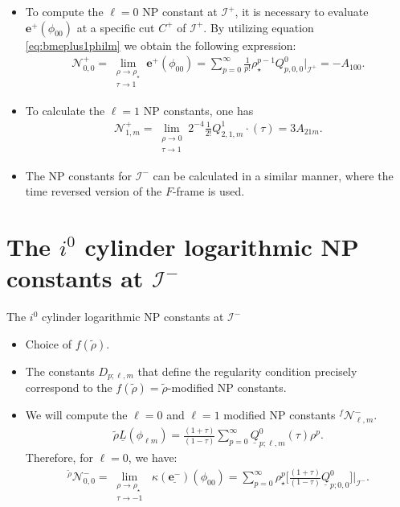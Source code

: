 \documentclass{beamer}
\theoremstyle{remark}
\theoremstyle{plain}
\theoremstyle{plain}
\begin{document}
\begin{frame}
  \begin{itemize}
    \item To compute the $\ell=0$ NP constant at $\mathscr{I}^{+}$, it is necessary to evaluate $\boldsymbol{e}^{+}(\phi_{00})$ at a specific cut ${C}^{+}$ of $\mathscr{I}^{+}$. By utilizing equation \eqref{eq:bmeplus1philm} we obtain the following expression:
    \begin{align}
      \mathcal{N}^{+}_{0,0}= \lim_{\substack{\rho \to \rho_{\star} \\ \tau \to 1}}  \boldsymbol{e}^{+}(\phi_{00}) =\sum_{p=0}^{\infty} \frac{1}{p!}\rho^{p-1}_{\star}Q^{0}_{p,0,0}|_{\mathscr{I}^{+}} = -A_{100}.
    \end{align}
    \item To calculate the $\ell = 1$ NP constants, one has\\
    \begin{align}
      \mathcal{N}^{+}_{1,m} = \lim _{\substack{\rho \rightarrow 0 \\ \tau \rightarrow 1}}2^{-4} \frac{1}{2 !} Q^{1}_{2, 1, m}\cdot(\tau) = 3A_{21m}.
    \end{align}
    \item The NP constants for $\mathscr{I}^{-}$ can be calculated in a similar manner, where the time reversed version of the $F$-frame is used.
  \end{itemize}
\end{frame}

\section{The $i^0$ cylinder logarithmic NP constants at $\mathscr{I}^{-}$}
\begin{frame}{The $i^0$ cylinder logarithmic NP constants at $\mathscr{I}^{-}$}
  \begin{itemize}
    \item Choice of $f(\tilde{\rho})$.
    \item The constants $D_{p;\ell,m}$ that define the regularity condition precisely correspond to the $f(\tilde{\rho}) = \tilde{\rho}$-modified NP constants.
    \item We will compute the $\ell=0$ and $\ell=1$ modified NP constants ${}^{f}\mathcal{N}^{-}_{\ell,m}$.
    \begin{align}
      \tilde{\rho}\underline{L} (\phi_{\ell m}) = \frac{(1+\tau)}{(1-\tau)}\sum_{p=0}^{\infty}\underline{Q}^{0}_{p;\ell,m}(\tau)\rho^p.
    \end{align}
    Therefore, for $\ell=0$, we have:
    \begin{align}
      \mathcal{}^{\tilde{\rho}}\mathcal{N}^{-}_{0,0} = \lim_{\substack{\rho \to \rho_{\star} \\ \tau \to -1}} \; \kappa(\underline{\boldsymbol{e}^{-}})(\phi_{00}) = \sum_{p=0}^{\infty}\rho_{\star}^p\biggl[\frac{(1+\tau)}{(1-\tau)}\underline{Q}^{0}_{p;0,0}\biggr]|_{\mathscr{I}^{-}}.
    \end{align}
  \end{itemize}
\end{frame}
\end{document}
